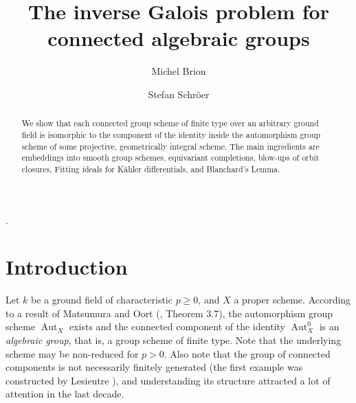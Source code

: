 \documentclass[oneside, 12pt]{amsart}
\theoremstyle{definition}
\theoremstyle{remark}
\newcommand{\Aut}{\operatorname{Aut}}
\begin{document}
\title[ ]
      {The inverse Galois problem for connected algebraic groups}.

\author[Michel Brion]{Michel Brion}
\address{Universit\'e Grenoble Alpes, Institut Fourier, CS 40700, 38058 Grenoble Cedex 9, France}
\curraddr{}
 
\author[Stefan Schr\"oer]{Stefan Schr\"oer}
\address{Heinrich Heine University Düsseldorf, Faculty of Mathematics and Natural Sciences, Mathematical Institute, 40204 D\"usseldorf, Germany}
\curraddr{}




\begin{abstract}
We show that each connected group scheme of finite type over 
an arbitrary ground field is isomorphic to the component of the identity 
inside the automorphism group scheme of some projective, geometrically
integral scheme. The main ingredients are embeddings into
smooth group schemes, equivariant completions, blow-ups 
of orbit closures, Fitting ideals for K\"ahler differentials,
and Blanchard's Lemma.
\end{abstract}

\maketitle
\tableofcontents
 
 
\section*{Introduction}
\label{Introduction}

Let $k$ be a ground field of characteristic $p\geq 0$, and $X$ a proper scheme. 
According to a result of Matsumura and Oort  (\cite{Matsumura; Oort 1967}, 
Theorem 3.7),  the automorphism group scheme $\Aut_X$ exists and 
the connected component of the identity $\Aut^0_X$ is an \emph{algebraic group}, 
that is,  a group scheme of finite type.
Note that  the underlying scheme may be non-reduced for $p>0$.
Also note  that the group of connected components is not necessarily finitely generated 
(the first example was constructed by Lesieutre \cite{Lesieutre 2018}),
and understanding its structure attracted a lot of attention in the last decade.
 
\end{document}
